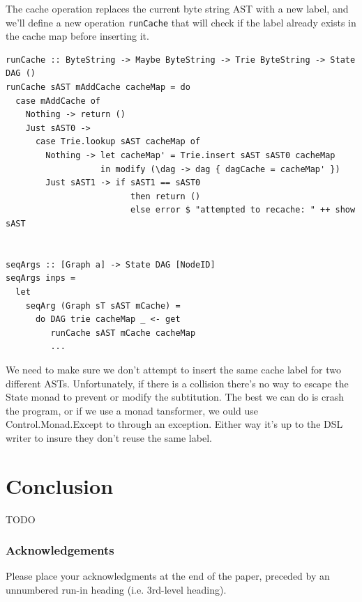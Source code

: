 \documentclass[runningheads]{llncs}
\begin{document}
The cache operation replaces the current byte string AST with a new label, and
we'll define a new operation \texttt{runCache} that will check if
the label already exists in the cache map before inserting it.
\begin{verbatim}
runCache :: ByteString -> Maybe ByteString -> Trie ByteString -> State DAG ()
runCache sAST mAddCache cacheMap = do
  case mAddCache of
    Nothing -> return ()
    Just sAST0 ->
      case Trie.lookup sAST cacheMap of
        Nothing -> let cacheMap' = Trie.insert sAST sAST0 cacheMap
                   in modify (\dag -> dag { dagCache = cacheMap' })
        Just sAST1 -> if sAST1 == sAST0
                         then return ()
                         else error $ "attempted to recache: " ++ show sAST


seqArgs :: [Graph a] -> State DAG [NodeID]
seqArgs inps =
  let
    seqArg (Graph sT sAST mCache) =
      do DAG trie cacheMap _ <- get
         runCache sAST mCache cacheMap
         ...
\end{verbatim}
We need to make sure we don't attempt to insert the same cache label for two
different ASTs. Unfortunately, if there is a collision there's no way to escape
the State monad to prevent or modify the subtitution. The best we can do is
crash the program, or if we use a monad tansformer, we ould use
Control.Monad.Except to through an exception. Either way it's up to the DSL
writer to insure they don't reuse the same label.

\section{Conclusion}
TODO

\subsubsection{Acknowledgements} Please place your acknowledgments at
the end of the paper, preceded by an unnumbered run-in heading (i.e.
3rd-level heading).

%
%


\end{document}
